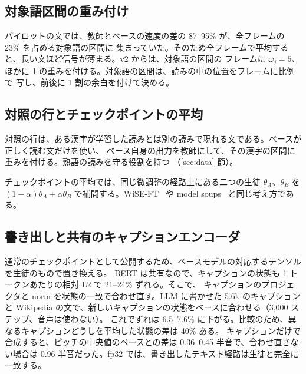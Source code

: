 \documentclass[10pt,a4paper,twocolumn]{article}
\begin{document}
\subsection{対象語区間の重み付け}
パイロットの文では、教師とベースの速度の差の 87--95\% が、全フレームの 23\% を占める対象語の区間に
集まっていた。そのため全フレームで平均すると、長い文ほど信号が薄まる。v2 からは、対象語の区間の
フレームに $\omega_j=5$、ほかに 1 の重みを付ける。対象語の区間は、読みの中の位置をフレームに比例で
写し、前後に 1 割の余白を付けて決める。

\subsection{対照の行とチェックポイントの平均}
対照の行は、ある漢字が学習した読みとは別の読みで現れる文である。ベースが正しく読む文だけを使い、
ベース自身の出力を教師にして、その漢字の区間に重みを付ける。熟語の読みを守る役割を持つ
（\ref{sec:data} 節）。

チェックポイントの平均では、同じ微調整の経路上にある二つの生徒 $\theta_A$、$\theta_B$ を
$(1-\alpha)\theta_A+\alpha\theta_B$ で補間する。WiSE-FT~\cite{wiseft} や model soups~\cite{soups}
と同じ考え方である。

\subsection{書き出しと共有のキャプションエンコーダ}\label{sec:export}
通常のチェックポイントとして公開するため、ベースモデルの対応するテンソルを生徒のもので置き換える。
BERT は共有なので、キャプションの状態も 1 トークンあたりの相対 L2 で 21--24\% ずれる。そこで、
キャプションのプロジェクタと norm を状態の一致で合わせ直す。LLM に書かせた 5.6k のキャプションと
Wikipedia の文で、新しいキャプションの状態をベースに合わせる（3,000 ステップ、音声は使わない）。
これでずれは 6.5--7.6\% に下がる。比較のため、異なるキャプションどうしを平均した状態の差は 40\% ある。
キャプションだけで合成すると、ピッチの中央値のベースとの差は 0.36--0.45 半音で、合わせ直さない場合は
0.96 半音だった。fp32 では、書き出したテキスト経路は生徒と完全に一致する。
\end{document}
